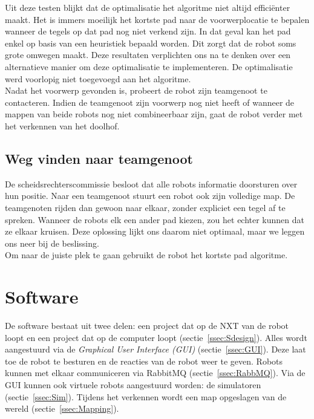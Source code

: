 \documentclass[tt2]{penoverslag}
\begin{document}
Uit deze testen blijkt dat de optimalisatie het algoritme niet altijd effici\"enter maakt. Het is immers moeilijk het kortste pad naar de voorwerplocatie te bepalen wanneer de tegels op dat pad nog niet verkend zijn. In dat geval kan het pad enkel op basis van een heuristiek bepaald worden. Dit zorgt dat de robot soms grote omwegen maakt. Deze resultaten verplichten ons na te denken over een alternatieve manier om deze optimalisatie te implementeren. De optimalisatie werd voorlopig niet toegevoegd aan het algoritme. \\

Nadat het voorwerp gevonden is, probeert de robot zijn teamgenoot te contacteren. Indien de teamgenoot zijn voorwerp nog niet heeft of wanneer de mappen van beide robots nog niet combineerbaar zijn, gaat de robot verder met het verkennen van het doolhof. \\

\subsection{Weg vinden naar teamgenoot}
\label{ssec:AlgoAndereRobot}
De scheidsrechterscommissie besloot dat alle robots informatie doorsturen over hun positie. Naar een teamgenoot stuurt een robot ook zijn volledige map. De teamgenoten rijden dan gewoon naar elkaar, zonder expliciet een tegel af te spreken. Wanneer de robots elk een ander pad kiezen, zou het echter kunnen dat ze elkaar kruisen. Deze oplossing lijkt ons daarom niet optimaal, maar we leggen ons neer bij de beslissing.\\

Om naar de juiste plek te gaan gebruikt de robot het kortste pad algoritme.


\section{Software}
\label{sec:Softw}
De software bestaat uit twee delen: een project dat op de NXT van de robot loopt en een project dat op de computer loopt (sectie~\ref{ssec:Sdesign}). Alles wordt aangestuurd via de \textit{Graphical User Interface (GUI)} (sectie~\ref{ssec:GUI}). Deze laat toe de robot te besturen en de reacties van de robot weer te geven. Robots kunnen met elkaar communiceren via RabbitMQ (sectie~\ref{ssec:RabbMQ}). Via de GUI kunnen ook virtuele robots aangestuurd worden: de simulatoren (sectie~\ref{ssec:Sim}). Tijdens het verkennen wordt een map opgeslagen van de wereld (sectie~\ref{ssec:Mapping}).\\
\end{document}
